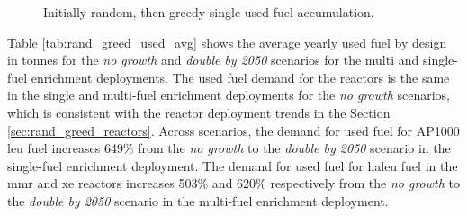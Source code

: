   \begin{figure}[H]
    \hfill
    \caption{Initially random, then greedy single used fuel accumulation.}
    \label{fig:rand_greed_of_used}
  \end{figure}


Table \ref{tab:rand_greed_used_avg} shows the average yearly used fuel by design in tonnes for the \textit{no growth} and \textit{double by 2050} scenarios for the multi and single-fuel enrichment deployments. The used fuel demand for the reactors is the same in the single and multi-fuel enrichment deployments for the \textit{no growth} scenarios, which is consistent with the reactor deployment trends in the Section \ref{sec:rand_greed_reactors}. Across scenarios, the demand for used fuel for AP1000 \gls{leu} fuel increases 649\% from the \textit{no growth} to the \textit{double by 2050} scenario in the single-fuel enrichment deployment. The demand for used fuel for \gls{haleu} fuel in the \gls{mmr} and \gls{xe} reactors increases 503\% and 620\% respectively from the \textit{no growth} to the \textit{double by 2050} scenario in the multi-fuel enrichment deployment.

